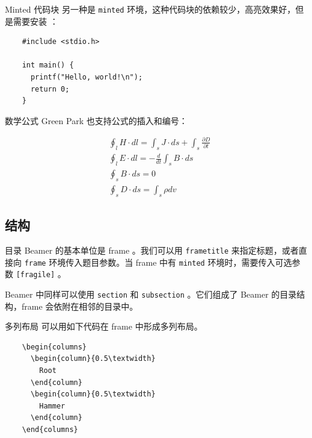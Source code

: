 \documentclass{ctexbeamer}
\begin{document}
\begin{frame}[fragile]{Minted 代码块}
  另一种是 \texttt{minted} 环境，这种代码块的依赖较少，高亮效果好，但是需要安装 ：
  \begin{verbatim}
    #include <stdio.h>

    int main() {
      printf("Hello, world!\n");
      return 0;
    }
  \end{verbatim}

\end{frame}

\begin{frame}{数学公式}
  Green Park 也支持公式的插入和编号：
  
  \begin{align}
    &\oint_{l} H \cdot dl=\int_{s}J\cdot ds+ \int_{s} \frac {\partial D} {\partial t} \\
    &\oint_{l} E \cdot dl=-\frac {d}{dt}\int_{s}B\cdot ds \\
    &\oint_{s}B\cdot ds=0 \\
    &\oint_{s}D\cdot ds=\int_{s}\rho dv
  \end{align}
\end{frame}

\subsection{结构}
\begin{frame}[fragile]{目录}
  Beamer 的基本单位是 frame 。我们可以用 \texttt{frametitle} 来指定标题，或者直接向 \texttt{frame} 环境传入题目参数。当 frame 中有 \texttt{minted} 环境时，需要传入可选参数 \texttt{[fragile]} 。

  Beamer 中同样可以使用 \texttt{section} 和 \texttt{subsection} 。它们组成了 Beamer 的目录结构，frame 会依附在相邻的目录中。
\end{frame}

\begin{frame}[fragile]{多列布局}
  可以用如下代码在 frame 中形成多列布局。
  \begin{verbatim}
    \begin{columns}  
      \begin{column}{0.5\textwidth}
        Root
      \end{column}
      \begin{column}{0.5\textwidth}
        Hammer
      \end{column}
    \end{columns}
  \end{verbatim}
\end{frame}
\end{document}

